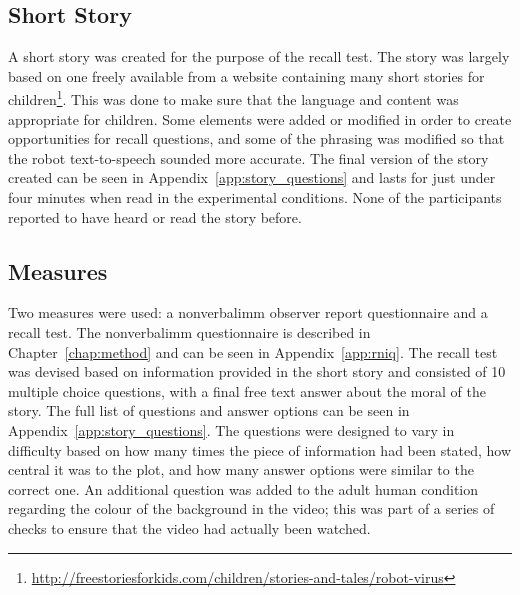\subsection{Short Story}
A short story was created for the purpose of the recall test. The story was largely based on one freely available from a website containing many short stories for children\footnote{\href{http://freestoriesforkids.com/children/stories-and-tales/robot-virus}{http://freestoriesforkids.com/children/stories-and-tales/robot-virus}}. This was done to make sure that the language and content was appropriate for children. Some elements were added or modified in order to create opportunities for recall questions, and some of the phrasing was modified so that the robot text-to-speech sounded more accurate. The final version of the story created can be seen in Appendix~\ref{app:story_questions} and lasts for just under four minutes when read in the experimental conditions. None of the participants reported to have heard or read the story before.

\subsection{Measures} \label{sec:ch4-measures}
Two measures were used: a \gls{nonverbalimm} observer report questionnaire and a recall test. The \gls{nonverbalimm} questionnaire is described in Chapter~\ref{chap:method} and can be seen in Appendix~\ref{app:rniq}. The recall test was devised based on information provided in the short story and consisted of 10 multiple choice questions, with a final free text answer about the moral of the story. The full list of questions and answer options can be seen in Appendix~\ref{app:story_questions}. The questions were designed to vary in difficulty based on how many times the piece of information had been stated, how central it was to the plot, and how many answer options were similar to the correct one. An additional question was added to the adult human condition regarding the colour of the background in the video; this was part of a series of checks to ensure that the video had actually been watched.

